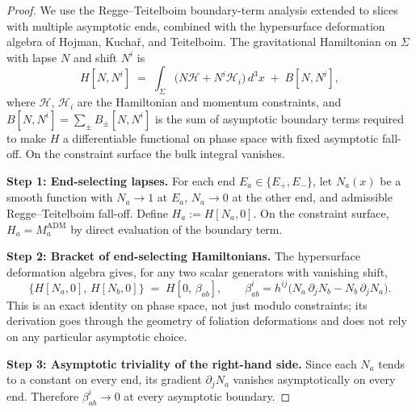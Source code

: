 \documentclass[aps,prd,onecolumn,nofootinbib,superscriptaddress]{revtex4-2}
\begin{document}
\begin{proof}
We use the Regge--Teitelboim boundary-term analysis extended to slices with multiple asymptotic ends,\cite{ReggeTeitelboim1974SurfaceIntegrals,Wald1984GeneralRelativity} combined with the hypersurface deformation algebra of Hojman, Kucha\v{r}, and Teitelboim.\cite{HojmanKucharTeitelboim1976Geometrodynamics} The gravitational Hamiltonian on $\Sigma$ with lapse $N$ and shift $N^i$ is
\begin{equation}
H[N,N^i] \;=\; \int_\Sigma \!\big(N\mathcal{H} + N^i\mathcal{H}_i\big)\, d^3x \;+\; B[N,N^i],
\end{equation}
where $\mathcal{H}$, $\mathcal{H}_i$ are the Hamiltonian and momentum constraints, and $B[N,N^i] = \sum_\pm B_\pm[N,N^i]$ is the sum of asymptotic boundary terms required to make $H$ a differentiable functional on phase space with fixed asymptotic fall-off. On the constraint surface the bulk integral vanishes.

\textbf{Step 1: End-selecting lapses.} For each end $E_a \in \{E_+, E_-\}$, let $N_a(x)$ be a smooth function with $N_a \to 1$ at $E_a$, $N_a \to 0$ at the other end, and admissible Regge--Teitelboim fall-off. Define $H_a := H[N_a, 0]$. On the constraint surface, $H_a = M_a^{\mathrm{ADM}}$ by direct evaluation of the boundary term.

\textbf{Step 2: Bracket of end-selecting Hamiltonians.} The hypersurface deformation algebra gives, for any two scalar generators with vanishing shift,
\begin{equation}
\label{eq:HDA}
\{H[N_a, 0],\, H[N_b, 0]\} \;=\; H[0,\, \beta_{ab}],
\qquad
\beta_{ab}^i = h^{ij}\big(N_a\, \partial_j N_b - N_b\, \partial_j N_a\big).
\end{equation}
This is an exact identity on phase space, not just modulo constraints; its derivation goes through the geometry of foliation deformations and does not rely on any particular asymptotic choice.\cite{HojmanKucharTeitelboim1976Geometrodynamics}

\textbf{Step 3: Asymptotic triviality of the right-hand side.} Since each $N_a$ tends to a constant on every end, its gradient $\partial_j N_a$ vanishes asymptotically on every end. Therefore $\beta_{ab}^i \to 0$ at every asymptotic boundary.


\end{proof}
\end{document}
